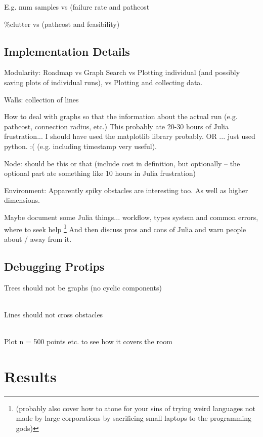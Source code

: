 \documentclass[a4paper]{article}
\begin{document}
    E.g. num samples vs (failure rate and pathcost
{\%clutter vs (pathcost and feasibility)

    \subsection{Implementation Details}

    Modularity: Roadmap vs Graph Search vs Plotting individual (and possibly
    saving plots of individual runs), vs Plotting and collecting data.

    Walls: collection of lines

    How to deal with graphs so that the information about the actual run (e.g.
    pathcost, connection radius, etc.)
    This probably ate 20-30 hours of Julia frustration... I should have used the
    matplotlib library probably. OR ... just used python. :(
    (e.g. including timestamp very useful).

    Node: should be this or that (include cost in definition, but optionally --
    the optional part ate something like 10 hours in Julia frustration)

    Environment: Apparently spiky obstacles are interesting too. As well as
    higher dimensions.

    Maybe document some Julia things... workflow, types system and common
    errors, where to seek help \footnote{(probably also cover how to atone for your sins of trying weird
    languages not made by large corporations by sacrificing small laptops to the
    programming gods)} And then discuss pros and cons of Julia and warn people about / away from it.

    \subsection{Debugging Protips}

    Trees should not be graphs (no cyclic components)

    \\

    Lines should not cross obstacles

    \\

    Plot n = 500 points etc. to see how it covers the room


\section{Results}

}
\end{document}
